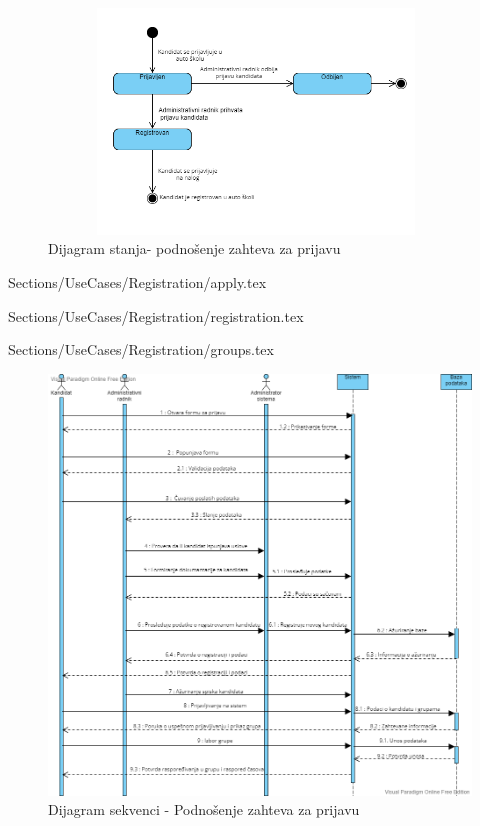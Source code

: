 \begin{figure}[H]
    \begin{center}
        \includegraphics[width=110mm, height=60mm]{Diagrams/dijagram_stanja_registracija.png}
    \end{center}
    \caption {Dijagram stanja- podnošenje zahteva za prijavu}
    \label{fig:stanja_kandidat_registracija}

\end{figure}

 {Sections/UseCases/Registration/apply.tex}

 {Sections/UseCases/Registration/registration.tex}

 {Sections/UseCases/Registration/groups.tex}


\begin{figure}[H]
    \begin{center}
        \includegraphics[width= 120mm]{Diagrams/dijagram_sekvence_podnosenje_zahteva.png}
    \end{center}
    \caption {Dijagram sekvenci - Podnošenje zahteva za prijavu}
    \label{fig:sekvenci_podnosenje_zahteva}

\end{figure}

